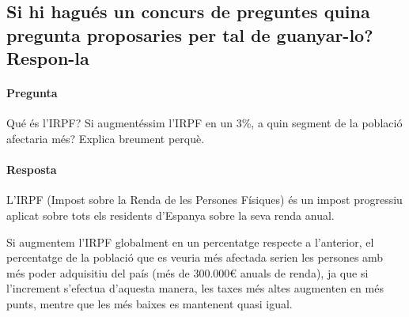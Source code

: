 \subsection{Si hi hagués un concurs de preguntes quina pregunta
proposaries per tal de guanyar-lo? Respon-la}

\paragraph{Pregunta}

Qué és l'IRPF? Si augmentéssim l'IRPF en un 3\%,
a quin segment de la població 
afectaria més? Explica breument perquè.

\paragraph{Resposta}

L'IRPF (Impost sobre la Renda de les Persones Físiques) és un impost 
progressiu aplicat sobre tots els residents d'Espanya sobre la seva renda
anual\cite{definicion_irpf}.

Si augmentem l'IRPF globalment en un percentatge respecte a l'anterior,
el percentatge de la població que es veuria més afectada serien les
persones amb més poder adquisitiu del país 
(més de 300.000€ anuals de renda), ja que si l'increment s'efectua 
d'aquesta manera, les taxes més altes augmenten en més punts, mentre
que les més baixes es mantenent quasi igual.
